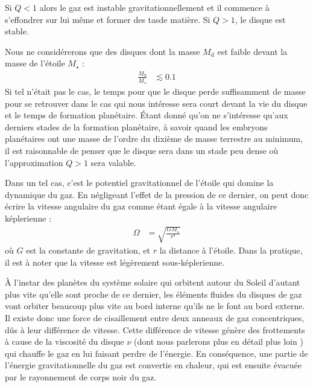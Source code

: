 \bigskip

Si $Q<1$ alors le gaz est instable gravitationnellement et il commence à s'effondrer sur lui même et former des \og tas\fg de matière.
Si $Q>1$, le disque est stable.


Nous ne considérerons que des disques dont la masse $M_\text{d}$ est faible devant la masse de l'étoile $M_\star$ :
\begin{align}
\frac{M_\text{d}}{M_\star} &\lesssim 0.1
\end{align}
Si tel n'était pas le cas, le temps pour que le disque perde suffisamment de masse pour se retrouver dans le cas qui nous intéresse sera court devant la vie du disque et le temps de formation planétaire. Étant donné qu'on ne s'intéresse qu'aux derniers stades de la formation planétaire, à savoir quand les embryons planétaires ont une masse de l'ordre du dixième de masse terrestre au minimum, il est raisonnable de penser que le disque sera dans un stade peu dense où l'approximation $Q>1$ sera valable.

Dans un tel cas, c'est le potentiel gravitationnel de l'étoile qui domine la dynamique du gaz. En négligeant l'effet de la pression de ce dernier, on peut donc écrire la vitesse angulaire du gaz comme étant égale à la vitesse angulaire képlerienne : 
\begin{align}
\Omega &= \sqrt{\frac{GM_\star}{r^3}}
\end{align}
où $G$ est la constante de gravitation, et $r$ la distance à l'étoile. Dans la pratique, il est à noter que la vitesse est légèrement sous-képlerienne. 

\bigskip

À l'instar des planètes du système solaire qui orbitent autour du Soleil d'autant plus vite qu'elle sont proche de ce dernier, les éléments fluides du disques de gaz vont orbiter beaucoup plus vite au bord interne qu'ils ne le font au bord externe. Il existe donc une force de cisaillement entre deux anneaux de gaz concentriques, dûs à leur différence de vitesse. Cette différence de vitesse génère des frottements à cause de la viscosité du disque $\nu$ (dont nous parlerons plus en détail plus loin ) qui chauffe le gaz en lui faisant perdre de l'énergie. En conséquence, une partie de l'énergie gravitationnelle du gaz est convertie en chaleur, qui est ensuite évacuée par le rayonnement de corps noir du gaz. 

